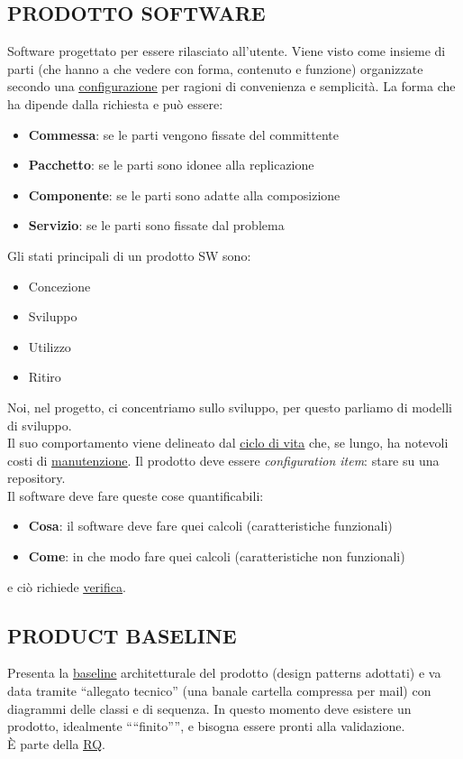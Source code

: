 		\subsection{PRODOTTO SOFTWARE}  \label{prodotto}
		Software progettato per essere rilasciato all'utente. Viene visto come insieme di parti (che hanno a che vedere con forma, contenuto e funzione) organizzate secondo una \underline{\hyperref[configurazione]{configurazione}} per ragioni di convenienza e semplicità. La forma che ha dipende dalla richiesta e può essere:
			\begin{itemize}
				\item \textbf{Commessa}: se le parti vengono fissate del committente
				\item \textbf{Pacchetto}: se le parti sono idonee alla replicazione
				\item \textbf{Componente}: se le parti sono adatte alla composizione
				\item \textbf{Servizio}: se le parti sono fissate dal problema
			\end{itemize}
		Gli stati principali di un prodotto SW sono:
		\begin{itemize}
			\item Concezione
			\item Sviluppo
			\item Utilizzo
			\item Ritiro
		\end{itemize}
		Noi, nel progetto, ci concentriamo sullo sviluppo, per questo parliamo di modelli di sviluppo. \\
		Il suo comportamento viene delineato dal \underline{\hyperref[ciclo]{ciclo di vita}} che, se lungo, ha notevoli costi di \underline{\hyperref[manutenzione]{manutenzione}}.
		Il prodotto deve essere \textit{configuration item}: stare su una repository. \\
		Il software deve fare queste cose quantificabili:
		\begin{itemize}
			\item \textbf{Cosa}: il software deve fare quei calcoli (caratteristiche funzionali)
			\item \textbf{Come}: in che modo fare quei calcoli (caratteristiche non funzionali)
		\end{itemize}
		e ciò richiede \underline{\hyperref[verificare]{verifica}}.


		\subsection{PRODUCT BASELINE}	 \label{productbaseline}
		Presenta la \underline{\hyperref[baseline]{baseline}} architetturale del prodotto (design patterns adottati) e va data tramite ``allegato tecnico'' (una banale cartella compressa per mail) con diagrammi delle classi e di sequenza.
		In questo momento deve esistere un prodotto, idealmente ````finito'''', e bisogna essere pronti alla validazione. \\
		È parte della \underline{\hyperref[RQ]{RQ}}.


